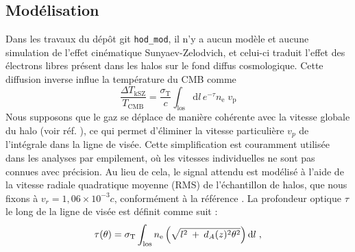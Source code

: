 \documentclass[a4paper, french, 11 pt]{article}
\newcommand{\deriv}{\mathrm{d}}
\begin{document}
\subsection{Modélisation}
Dans les travaux du dépôt git \verb|hod_mod|, il n'y a aucun modèle et aucune simulation de l'effet cinématique Sunyaev-Zelodvich, et celui-ci traduit l'effet des électrons libres présent dans les halos sur le fond diffus cosmologique. Cette diffusion inverse influe la température du CMB comme
\begin{equation}
    \frac{\Delta T_\mathrm{kSZ}}{T_\mathrm{CMB}} = \frac{\sigma_\mathrm{T}}{c} \int_\mathrm{los} \mathrm{d}l\,e^{-\tau} n_\mathrm{e} \; v_\mathrm{p}
\end{equation}
Nous supposons que le gaz se déplace de manière cohérente avec la vitesse globale du halo (voir réf. \cite{Hadzhiyska2023}), ce qui permet d'éliminer la vitesse particulière $v_p$ de l'intégrale dans la ligne de visée. Cette simplification est couramment utilisée dans les analyses par empilement, où les vitesses individuelles ne sont pas connues avec précision. Au lieu de cela, le signal attendu est modélisé à l'aide de la vitesse radiale quadratique moyenne (RMS) de l'échantillon de halos, que nous fixons à $v_r = 1,06 \times 10^{-3}c$, conformément à la référence \cite{Amodeo2021}. La profondeur optique $\tau$ le long de la ligne de visée est définit comme suit :
\begin{equation}
\tau(\theta) =  \sigma_\mathrm{T} \int_{\rm los} n_{\mathrm{e}}\left(\sqrt{l^2\:+\:d_A(z)^2\theta^2}\right)\deriv l\;,
\end{equation}
\end{document}
